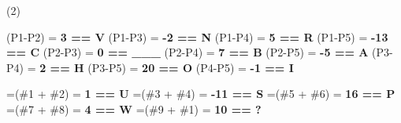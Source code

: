 \begin{tasks}[label=\#\arabic*, label-width=1.60em](2)

    \task (P1-P2) = \textbf{3 == V}
    \vspace{2cm}
    \task (P1-P3) = \textbf{-2 == N}
    \vspace{2cm}
    \task (P1-P4) = \textbf{5 == R}
    \vspace{2cm}
    \task (P1-P5) = \textbf{-13 == C}
    \vspace{2cm}    
    \task (P2-P3) = \textbf{0 == \_\_\_}
    \vspace{2cm}
    \task (P2-P4) = \textbf{7 == B}
    \vspace{2cm}
    \task (P2-P5) = \textbf{-5 == A}
    \vspace{2cm}
    \task (P3-P4) = \textbf{2 == H}
    \vspace{2cm}
    \task (P3-P5) = \textbf{20 == O}
    \vspace{2cm}
    \task (P4-P5) = \textbf{-1 == I}
    \vspace{2cm}
    
    \task=(\#1 + \#2) = \textbf{1 == U}
    \vspace{2cm}
    \task=(\#3 + \#4) = \textbf{-11 == S} %
    \vspace{2cm}
    \task=(\#5 + \#6) = \textbf{16 == P} %
    \vspace{2cm}
    \task=(\#7 + \#8) = \textbf{4 == W} %
    \vspace{2cm}
    \task=(\#9 + \#1) = \textbf{10 == ?} %

\end{tasks}